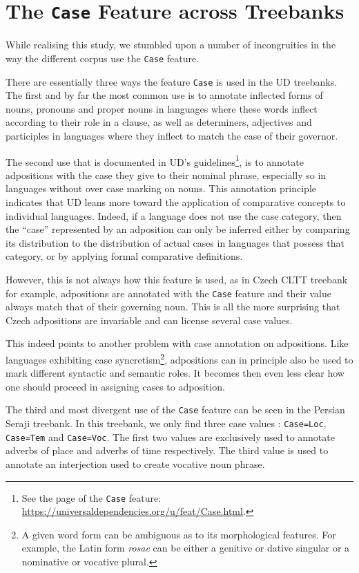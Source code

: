\section{The \texttt{Case} Feature across Treebanks}
While realising this study, we stumbled upon a number of incongruities in the way the different corpus use the \texttt{Case} feature.

There are essentially three ways the feature \texttt{Case} is used in the UD treebanks.
The first and by far the most common use is to annotate inflected forms of nouns, pronouns and proper nouns in languages where these words inflect according to their role in a clause, as well as determiners, adjectives and participles in languages where they inflect to match the case of their governor.

The second use that is documented in UD's guidelines\footnote{See the page of the \texttt{Case} feature: \url{https://universaldependencies.org/u/feat/Case.html}.}, is to annotate adpositions with the case they give to their nominal phrase, especially so in languages without over case marking on nouns.
This annotation principle indicates that UD leans more toward the application of comparative concepts to individual languages.
Indeed, if a language does not use the case category, then the ``case'' represented by an adposition can only be inferred either by comparing its distribution to the distribution of actual cases in languages that possess that category, or by applying formal comparative definitions.

However, this is not always how this feature is used, as in Czech CLTT treebank \cite{cltt} for example, adpositions are annotated with the \texttt{Case} feature and their value always match that of their governing noun.
This is all the more surprising that Czech adpositions are invariable and can license several case values.

This indeed points to another problem with case annotation on adpositions.
Like languages exhibiting case syncretism\footnote{A given word form can be ambiguous as to its morphological features. For example, the Latin form \textit{rosae} can be either a genitive or dative singular or a nominative or vocative plural.}, adpositions can in principle also be used to mark different syntactic and semantic roles.
It becomes then even less clear how one should proceed in assigning cases to adposition.

The third and most divergent use of the \texttt{Case} feature can be seen in the Persian Seraji treebank.
In this treebank, we only find three case values : \texttt{Case=Loc}, \texttt{Case=Tem} and \texttt{Case=Voc}.
The first two values are exclusively used to annotate adverbs of place and adverbs of time respectively.
The third value is used to annotate an interjection used to create vocative noun phrase.

